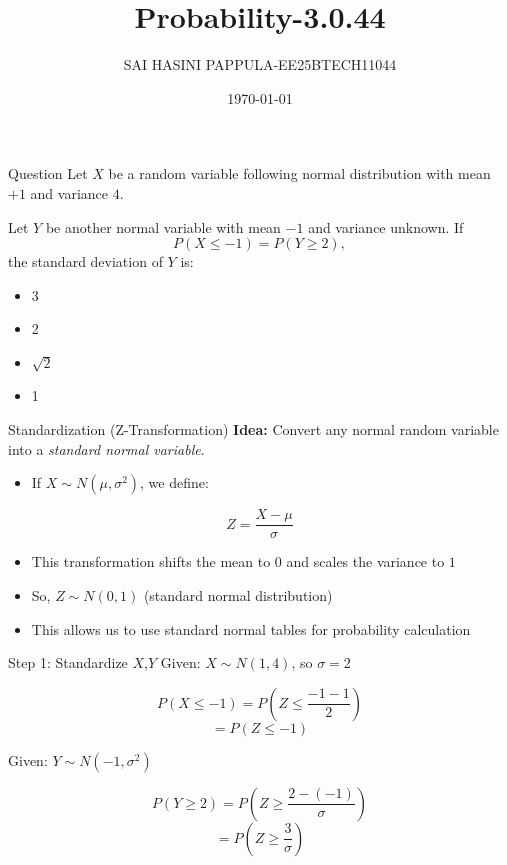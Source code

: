 \documentclass{beamer}
\title{Probability-3.0.44}
\author{SAI HASINI PAPPULA-EE25BTECH11044}
\date{\today}
\begin{document}
\begin{frame}
\titlepage
\end{frame}
\begin{frame}{Question}
Let $X$ be a random variable following normal distribution with mean $+1$ and variance $4$. 

Let $Y$ be another normal variable with mean $-1$ and variance unknown. If
\[
P(X \le -1) = P(Y \ge 2),
\]
the standard deviation of $Y$ is:

\begin{itemize}
    \item[(a)] 3
    \item[(b)] 2
    \item[(c)] $\sqrt{2}$
    \item[(d)] 1
\end{itemize}
\end{frame}


\begin{frame}{Standardization (Z-Transformation)}
\textbf{Idea:} Convert any normal random variable into a \textit{standard normal variable}.

\begin{itemize}
    \item If $X \sim N(\mu, \sigma^2)$, we define:
\end{itemize}

\[
Z = \frac{X - \mu}{\sigma}
\]

\begin{itemize}
    \item This transformation shifts the mean to $0$ and scales the variance to $1$
    \item So, $Z \sim N(0,1)$ (standard normal distribution)
    \item This allows us to use standard normal tables for probability calculation
\end{itemize}

\end{frame}


\begin{frame}{Step 1: Standardize $X$,$Y$}
Given: $X \sim N(1,4)$, so $\sigma = 2$

\[
P(X \le -1) = P\left(Z \le \frac{-1 - 1}{2}\right)
\]
\[
= P(Z \le -1)
\]

Given: $Y \sim N(-1,\sigma^2)$

\[
P(Y \ge 2) = P\left(Z \ge \frac{2 - (-1)}{\sigma}\right)
\]
\[
= P\left(Z \ge \frac{3}{\sigma}\right)
\]
\end{frame}
\end{document}
